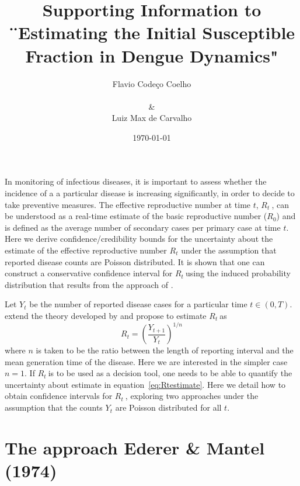\documentclass[12pt]{article}
\title{
Supporting Information to ¨Estimating the Initial Susceptible Fraction in Dengue Dynamics"
}
\author{Flavio Code\c{c}o Coelho \\
\\
\& \\
Luiz Max de Carvalho \\
}
\date{\today}
\def \rr {$R_{t}\ $}
\begin{document}
                                  
% 

%
\maketitle

In monitoring of infectious diseases, it is important to assess whether the incidence of a a particular disease is increasing significantly, in order to decide to take preventive measures.
The effective reproductive number at time $t$, \rr, can be understood as a real-time estimate of the basic reproductive number ($R_{0}$) and is defined as the average number of secondary cases per primary case at time $t$.
Here we derive confidence/credibility bounds for the uncertainty about the estimate of the effective reproductive number $R_t$ under the assumption that reported disease counts are Poisson distributed.
It is shown that one can construct a conservative confidence interval for \rr using the induced probability distribution that results from the approach of \citet{mantel}.

Let $Y_t$ be the number of reported disease cases for a particular time $t \in (0, T)$.
\citet{nishiura} extend the theory developed by \citet{stallybrass} and propose to estimate \rr as
\begin{equation}
\label{eq:Rtestimate}
R_t = \left( \frac{Y_{t+1}}{Y_t}\right)^{1/n}
\end{equation}
where $n$ is taken to be the ratio between the length of reporting interval and the mean generation time of the disease.
Here we are interested in the simpler case $n=1$.
If \rr is to be used as a decision tool, one needs to be able to quantify the uncertainty about estimate in equation~\ref{eq:Rtestimate}. 
Here we detail how to obtain confidence intervals for \rr, exploring two approaches under the assumption that the counts $Y_t$ are Poisson distributed for all $t$.

\section*{The approach Ederer \& Mantel (1974)}
\end{document}
